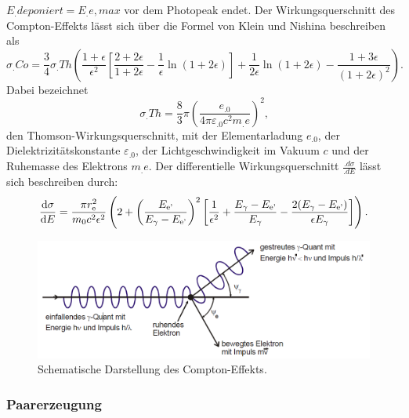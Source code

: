 $E_.{deponiert}=E_.{e,max}$ vor dem Photopeak endet.
Der Wirkungsquerschnitt des Compton-Effekts lässt sich über die Formel von Klein und Nishina beschreiben als
\begin{equation}
\sigma_.{Co}=\frac{3}{4}\sigma_.{Th}\left(\frac{1+\epsilon}{\epsilon^2}\left[\frac{2+2\epsilon}{1+2\epsilon}-\frac{1}{\epsilon}\ln(1+2\epsilon)\right]+\frac{1}{2\epsilon}\ln(1+2\epsilon)-\frac{1+3\epsilon}{(1+2\epsilon)^2}\right)\text{.}\label{eq:sig_Co}
\end{equation}
Dabei bezeichnet 
\[
\sigma_.{Th}=\frac{8}{3}\pi\left(\frac{e_.0}{4\pi\varepsilon_.0c^2m_.e}\right)^2\text{,}
\] 
den Thomson-Wirkungsquerschnitt, mit der Elementarladung $e_.0$, der Dielektrizitätskonstante $\varepsilon_.0$, der Lichtgeschwindigkeit im Vakuum $c$ und der Ruhemasse des Elektrons $m_.e$.
Der differentielle Wirkungsquerschnitt $\frac{.d\sigma}{.dE}$ lässt sich beschreiben durch:
\begin{equation}
\frac{\mathop{}\!\mathrm{d} \sigma}{\mathop{}\!\mathrm{d} E} =  \frac{\pi r_\text{e}^2}{m_0 c^2 \epsilon^2}\left(2+\left(\frac{E_\text{e'}}{E_\gamma - E_\text{e'}}\right)^2 \left[ \frac{1}{\epsilon^2} +\frac{E_\gamma - E_\text{e'}}{E_\gamma} - \frac{2(E_\gamma - E_\text{e'})}{\epsilon E_\gamma} \right]\right) \text{.}\label{eq:sigmadiff}
\end{equation}

\begin{figure}
	\centering
	\includegraphics[width=\linewidth-60pt,height=\textheight-60pt,keepaspectratio]{content/images/Compton.pdf}
	\caption{Schematische Darstellung des Compton-Effekts\cite{V18}.}
	\label{fig:Compton}
\end{figure}

\subsubsection{Paarerzeugung}

